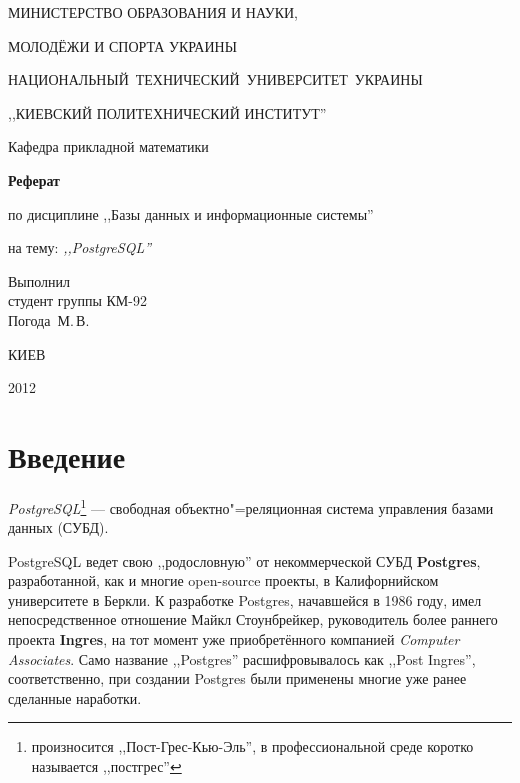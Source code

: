 \documentclass[a4paper,12pt,notitlepage,headsepline,pdftex]{scrartcl}
\begin{document}
\begin{titlepage}
  \begin{center}
    \large
    \MakeUppercase{Министерство образования и науки,}

    \MakeUppercase{молодёжи и спорта Украины}

    \mbox{\MakeUppercase{Национальный технический университет Украины}}

    \MakeUppercase{,,Киевский политехнический институт''}

    \addvspace{6pt}

    \normalsize
    Кафедра прикладной математики

    \vfill

    \textbf{Реферат}

    по дисциплине ,,Базы данных и информационные системы''

    на тему: \textit{,,PostgreSQL''}
  \end{center}

  \vfill

  \noindent
  Выполнил\\
  студент группы КМ-92\\
  Погода~М.\,В.\\
  \vfill

  \begin{center}
    КИЕВ

    2012
  \end{center}
\end{titlepage}

\tableofcontents
\clearpage

\section{Введение}
  \emph{PostgreSQL}\footnote{произносится ,,Пост-Грес-Кью-Эль'', в
    профессиональной среде коротко называется ,,постгрес''} --- свободная
  объектно"=реляционная система управления базами данных (СУБД).

  PostgreSQL ведет свою ,,родословную'' от некоммерческой СУБД
  \textbf{Postgres}, разработанной, как и многие open-source проекты, в
  Калифорнийском университете в Беркли.
  К разработке Postgres, начавшейся в 1986 году, имел непосредственное
  отношение Майкл Стоунбрейкер, руководитель более раннего проекта
  \textbf{Ingres}, на тот момент уже приобретённого компанией \emph{Computer
  Associates}.
  Само название ,,Postgres'' расшифровывалось как ,,Post Ingres'',
  соответственно, при создании Postgres были применены многие уже ранее
  сделанные наработки.
\end{document}
